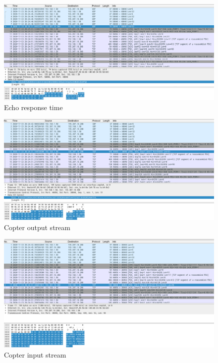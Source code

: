 \documentclass[12pt, a4paper]{article}
\begin{document}
\pagebreak
\begin{figure}[h!]
\centering
	\includegraphics[height=.4\textheight, width=\textwidth, keepaspectratio]{assets/wireshark/copter2.png}
	\caption{Echo response time} 
\end{figure}

\begin{figure}[h!]
\centering
	\includegraphics[height=.4\textheight, width=\textwidth, keepaspectratio]{assets/wireshark/copter3.png}
	\caption{Copter output stream} 
\end{figure}

\pagebreak

\begin{figure}[h!]
\centering
	\includegraphics[height=.4\textheight, width=\textwidth, keepaspectratio]{assets/wireshark/copter4.png}
	\caption{Copter input stream} 
\end{figure}
\end{document}
